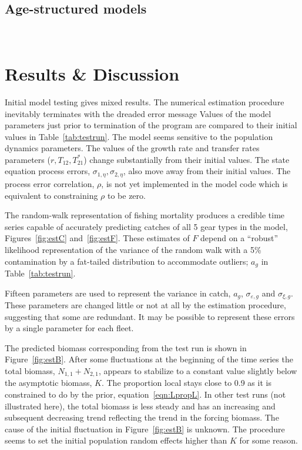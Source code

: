 \documentclass[12pt,letterpaper]{article}
\newcommand\help[1]{\color{Magenta}{\it #1 }\normalcolor}
\newcommand\Nsum{{N_{1,1}+N_{2,1}}}
\begin{document}
\subsection*{Age-structured models}
~
\centerline{\help{Not yet available.}}

\section*{Results \& Discussion}
Initial model testing gives mixed results. The numerical estimation
procedure inevitably terminates with the dreaded error message 
\help{``Matrix not positive definite in Ln\_det\_choleski''.}
Values of the model parameters just prior to termination of the program are
compared to their initial values in Table~\ref{tab:testrun}.
The model seems sensitive to the population dynamics parameters. The
values of the
growth rate and transfer rates parameters ($r,T_{12}, T_{21}^*$)
change substantially from their initial values.
The state equation process errors, $\sigma_{1,\eta},\sigma_{2,\eta}$,
also move away from their initial values.
The process error correlation, $\rho$, is not yet implemented in the model
code which is equivalent to constraining $\rho$ to be zero.

The random-walk representation of fishing mortality
produces a credible time series
capable of accurately predicting catches
of all 5 gear types in the model, 
Figures~\ref{fig:estC} and~\ref{fig:estF}.
These estimates of $F$ depend on a ``robust'' likelihood representation
of the variance of the random walk with a 5\% contamination by a fat-tailed
distribution to accommodate outliers; $a_g$ in Table~\ref{tab:testrun}.

Fifteen parameters are used to represent the variance in catch, $a_g$, 
$\sigma_{\varepsilon,g}$ and $\sigma_{\xi,g}$.
These parameters are changed little or not at all by the estimation
procedure, suggesting that some are redundant.
It may be possible to represent these errors by a single parameter for
each fleet.

The predicted biomass corresponding from the test run is shown in
Figure~\ref{fig:estB}. After some fluctuations at the beginning of
the time series the total biomass, $\Nsum$, appears to stabilize to a
constant value slightly below the asymptotic biomass, $K$. The
proportion local stays close to 0.9 as it is constrained to do by the
prior, equation~\ref{eqn:LpropL}.
In other test runs (not illustrated here), 
the total biomass is less steady and has an
increasing and subsequent decreasing trend reflecting the trend in the
forcing biomass.
The cause of the initial fluctuation in
Figure~\ref{fig:estB} is unknown. The procedure seems
to set the initial population random effects higher than $K$ for some
reason.
\end{document}
